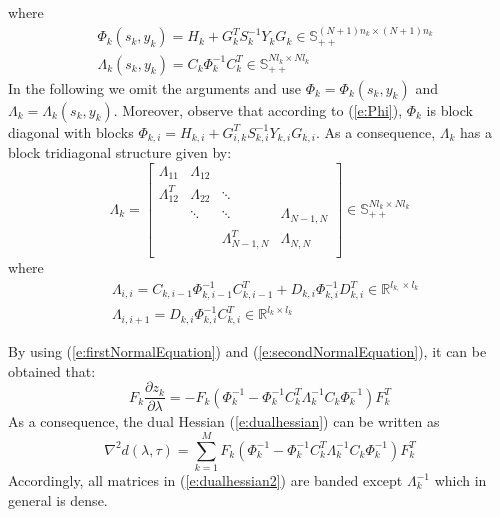 where
\begin{subequations}
\begin{align}
& \Phi_k (s_k, y_k) = H_k + G_k^T S_k^{-1} Y_k G_k \in \mathbb{S}_{++}^{(N+1)n_k \times (N+1)n_k} \label{e:Phi} \\
& \Lambda_k (s_k, y_k) = C_k \Phi_k^{-1} C_k^{T} \in \mathbb{S}_{++}^{N l_k \times N l_k} \label{e:Lambda}
\end{align}
\end{subequations}
In the following we omit the arguments and use $\Phi_k = \Phi_k(s_k, y_k)$ and $\Lambda_k = \Lambda_k (s_k, y_k)$. Moreover, observe that according to (\ref{e:Phi}), $\Phi_k$ is block diagonal with blocks $\Phi_{k,i} = H_{k,i} + G_{i,k}^T S_{k,i}^{-1} Y_{k,i} G_{k,i}$. As a consequence, $\Lambda_k$ has a block tridiagonal structure given by:
\begin{equation}
\Lambda_k = \left[ \begin{array}{cccc} 
\Lambda_{11} &  \Lambda_{12} &   &  \\
\Lambda_{12}^T &  \Lambda_{22} & \ddots  &  \\
  &  \ddots & \ddots  & \Lambda_{N-1,N} \\
    &   & \Lambda_{N-1,N}^T  & \Lambda_{N,N} \\
\end{array} \right] \in \mathbb{S}_{++}^{N l_{k} \times N l_{k}}
\end{equation}
where
\begin{subequations}
\label{e:LambdaComponents}
\begin{align}
& \Lambda_{i,i} = C_{k,i-1}\Phi_{k,i-1}^{-1}C_{k,i-1}^T + D_{k,i}\Phi_{k,i}^{-1}D_{k,i}^T \in \mathbb{R}^{l_{k,} \times l_{k}} \\
& \Lambda_{i,i+1} = D_{k,i} \Phi_{k,i}^{-1}C_{k,i}^T \in \mathbb{R}^{l_{k} \times l_{k}}
\end{align}
\end{subequations}

By using (\ref{e:firstNormalEquation}) and (\ref{e:secondNormalEquation}), it can be obtained that:
\begin{equation}
\label{e:localcontributions}
F_k \frac{\partial z_k}{\partial \lambda} = -F_k (\Phi_k^{-1} - \Phi_k^{-1} C_k^T \Lambda_k^{-1} C_k \Phi_k^{-1}) F_k^T
\end{equation}
As a consequence, the dual Hessian (\ref{e:dualhessian}) can be written as
\begin{equation}
\label{e:dualhessian2}
\nabla^2 d(\lambda, \tau) = \sum_{k=1}^M F_k (\Phi_k^{-1} - \Phi_k^{-1} C_k^T \Lambda_k^{-1} C_k \Phi_k^{-1}) F_k^T
\end{equation}
Accordingly, all matrices in (\ref{e:dualhessian2}) are banded except $\Lambda_k^{-1}$ which in general is dense.


